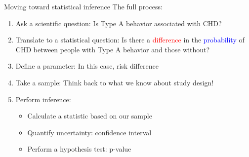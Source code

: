\documentclass[10pt,t]{beamer}
\begin{document}
\begin{frame}{Moving toward statistical inference}
	The full process:
	\begin{enumerate}
		\item Ask a scientific question: Is Type A behavior associated with CHD?\pause
		\item Translate to a statistical question: Is there a \textcolor{red}{difference} in the \textcolor{blue}{probability} of CHD between people with Type A behavior and those without? \pause
		\item Define a parameter: In this case, risk difference \pause
		\item Take a sample: Think back to what we know about study design! \pause
		\item Perform inference: 
		\begin{itemize}
			\item Calculate a statistic based on our sample
			\item Quantify uncertainty: confidence interval
			\item Perform a hypothesis test: p-value
		\end{itemize}
	\end{enumerate}
\end{frame}



\end{document}
